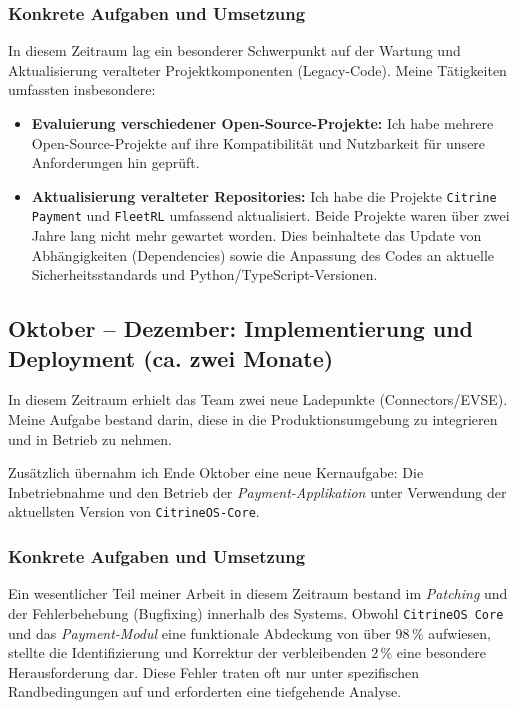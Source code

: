 \documentclass[12pt,a4paper]{report}
\begin{document}
\subsubsection{Konkrete Aufgaben und Umsetzung} 
In diesem Zeitraum lag ein besonderer Schwerpunkt auf der Wartung und Aktualisierung veralteter Projektkomponenten (Legacy-Code). Meine Tätigkeiten umfassten insbesondere: 

\begin{itemize}
    \item \textbf{Evaluierung verschiedener Open-Source-Projekte:} Ich habe mehrere Open-Source-Projekte auf ihre Kompatibilität und Nutzbarkeit für unsere Anforderungen hin geprüft.
    \item \textbf{Aktualisierung veralteter Repositories:} Ich habe die Projekte \texttt{Citrine Payment} und \texttt{FleetRL} umfassend aktualisiert. Beide Projekte waren über zwei Jahre lang nicht mehr gewartet worden. Dies beinhaltete das Update von Abhängigkeiten (Dependencies) sowie die Anpassung des Codes an aktuelle Sicherheitsstandards und Python/TypeScript-Versionen.
\end{itemize}


\subsection{Oktober -- Dezember: Implementierung und Deployment (ca. zwei Monate)}
In diesem Zeitraum erhielt das Team zwei neue Ladepunkte (Connectors/EVSE). 
Meine Aufgabe bestand darin, diese in die Produktionsumgebung zu integrieren und in Betrieb zu nehmen.

Zusätzlich übernahm ich Ende Oktober eine neue Kernaufgabe:
 Die Inbetriebnahme und den Betrieb der \textit{Payment-Applikation} 
 unter Verwendung der aktuellsten Version von \texttt{CitrineOS-Core}.

\subsubsection{Konkrete Aufgaben und Umsetzung} 
Ein wesentlicher Teil meiner Arbeit in diesem Zeitraum bestand im \textit{Patching} 
und der Fehlerbehebung (Bugfixing) innerhalb des Systems. Obwohl \texttt{CitrineOS Core} 
und das \textit{Payment-Modul} eine funktionale Abdeckung von über 98\,\% aufwiesen,
 stellte die Identifizierung und Korrektur der verbleibenden 2\,\% eine besondere Herausforderung dar. 
 Diese Fehler traten oft nur unter spezifischen Randbedingungen auf und erforderten eine tiefgehende Analyse.
\end{document}
